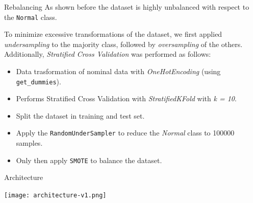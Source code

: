 \documentclass[12pt,aspectratio=169,notheorems]{beamer}
\begin{document}
\begin{frame}{Rebalancing}
    \small As shown before the dataset is highly unbalanced with respect to the \texttt{Normal} class. 
    \vspace{-0.1cm}
        \begin{table}[t]
        \end{table}
        \vspace{-0.1cm}
        \small To minimize excessive transformations of the dataset, we first applied \emph{undersampling} to the majority class, followed by \emph{oversampling} of the others. Additionally, \emph{Stratified Cross Validation} was performed as follows:
    \begin{itemize}
        \item Data trasformation of nominal data with \emph{OneHotEncoding} (using \texttt{get\_dummies}).
        \item Performs Stratified Cross Validation with \emph{StratifiedKFold} with \emph{k = 10}.
        \item Split the dataset in training and test set.
        \item Apply the \texttt{RandomUnderSampler} to reduce the \emph{Normal} class to 100000 samples.
        \item Only then apply \texttt{SMOTE} to balance the dataset.
    \end{itemize}
    \end{frame}


\begin{frame}{Architecture}
    \begin{center}
        \texttt{[image: architecture-v1.png]}
    \end{center}
\end{frame}
\end{document}
